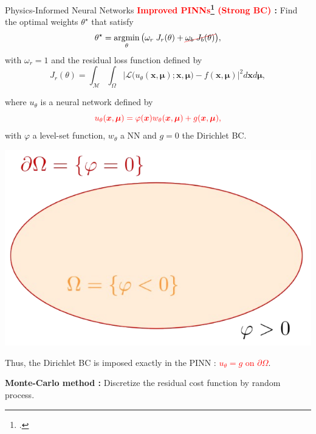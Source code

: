 \begin{frame}[noframenumbering]{Physics-Informed Neural Networks}
	\textbf{\textcolor{red}{Improved PINNs\footcite{LagLikFot1998,FraMicNav2024} (Strong BC)} :} Find the optimal weights $\theta^\star$ that satisfy
	\begin{equation}
		\label{eq:opt_pb_nobc}
		\theta^\star = \argmin_{\theta}	\big( \omega_r \; J_r(\theta) + \Ccancel[red]{\omega_b \; J_b(\theta)} \big),
	\end{equation}
	with $\omega_r=1$ and the residual loss function defined by
	\begin{equation*}
		J_r(\theta) =
		\int_{\mathcal{M}}\int_{\Omega}
		\big| \mathcal{L}\big(u_\theta(\bm{x},\bm{\mu});\bm{x},\bm{\mu}\big)-f(\bm{x},\bm{\mu}) \big|^2 d\bm{x} d\bm{\mu},
	\end{equation*}
	\begin{minipage}{0.75\linewidth}
		where $u_\theta$ is a neural network defined by
		\begin{equation*}
			\textcolor{red}{u_{\theta}(\bm{x},\bm{\mu}) = \varphi(\bm{x}) w_{\theta}(\bm{x},\bm{\mu}) + g(\bm{x},\bm{\mu}),}
		\end{equation*}
		with $\varphi$ a level-set function, $w_\theta$ a NN and $g=0$ the Dirichlet BC. 
	\end{minipage}
	\begin{minipage}{0.23\linewidth}
		\vspace{-15pt}
		\hspace{-23pt}\includegraphics[width=1.3\linewidth]{images/intro/levelset.png}
	\end{minipage}

	Thus, the Dirichlet BC is imposed exactly in the PINN : \textcolor{red}{$u_{\theta} = g$ on $\partial \Omega$}.

	\vspace{5pt}
	\textbf{Monte-Carlo method :} Discretize the residual cost function by random process.
	\vspace{15pt}
\end{frame}


